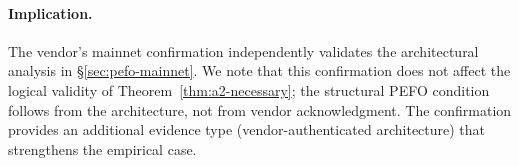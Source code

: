 \paragraph{Implication.}
The vendor's mainnet confirmation independently validates the architectural
analysis in \S\ref{sec:pefo-mainnet}. We note that this confirmation does not
affect the logical validity of Theorem~\ref{thm:a2-necessary}; the structural
PEFO condition follows from the architecture, not from vendor acknowledgment.
The confirmation provides an additional evidence type (vendor-authenticated
architecture) that strengthens the empirical case.
